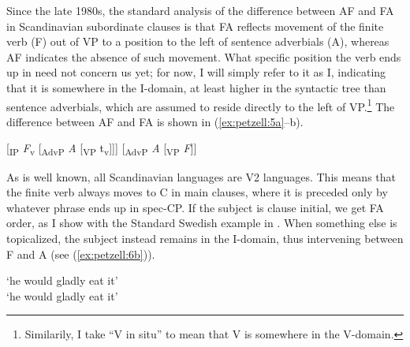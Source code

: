 \documentclass[output=paper,colorlinks,citecolor=brown,draft,draftmode]{langscibook}
\begin{document}
Since the late 1980s, the standard analysis of the difference between AF and FA in Scandinavian subordinate clauses is that FA reflects movement of the finite verb (F) out of VP to a position to the left of sentence adverbials (A), whereas AF indicates the absence of such movement. What specific position the verb ends up in need not concern us yet; for now, I will simply refer to it as I, indicating that it is somewhere in the I-domain, at least higher in the syntactic tree than sentence adverbials, which are assumed to reside directly to the left of VP.\footnote{Similarily, I take “V in situ” to mean that V is somewhere in the V-domain.} The difference between AF and FA is shown in (\ref{ex:petzell:5a}–b).


\ea\label{ex:petzell:5}
\ea\label{ex:petzell:5a}
[\textsubscript{IP} \textit{F}\textsubscript{v} [\textsubscript{AdvP} \textit{A} [\textsubscript{VP} t\textsubscript{v}]]]                      
\ex\label{ex:petzell:5b}{}  [\textsubscript{AdvP} \textit{A} [\textsubscript{VP} \textit{F}]]                        
\z
\z


As is well known, all Scandinavian languages are V2 languages. This means that the finite verb always moves to C in main clauses, where it is preceded only by whatever phrase ends up in spec-CP. If the subject is clause initial, we get FA order, as I show with the Standard Swedish example in . When something else is topicalized, the subject instead remains in the I-domain, thus intervening between F and A (see (\ref{ex:petzell:6b})).


\ea\label{ex:petzell:6}
\glt `he would gladly eat it’  \\
\glt `he would gladly eat it’
\z
\z
\end{document}
